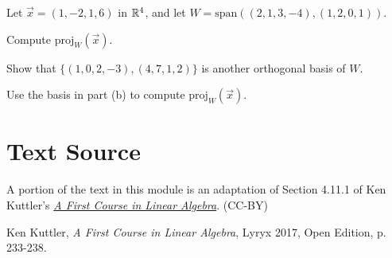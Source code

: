 \documentclass{ximera}
\begin{document}
\begin{problem}
Let $\vec{x} = (1, -2, 1, 6)$ in $\mathbb{R}^4$, and let $W = \mbox{span}\left((2, 1, 3, -4), (1, 2, 0, 1)\right)$.
\begin{problem}\label{OrthoProj1.1}
Compute $\mbox{proj}_W(\vec{x})$.
\end{problem}

\begin{problem}\label{OrthoProj1.2}
Show that $\{(1, 0, 2, -3), (4, 7, 1, 2)\}$ is another orthogonal basis of $W$.
\end{problem}

\begin{problem}\label{OrthoProj1.3}
Use the basis in part (b) to compute $\mbox{proj}_W(\vec{x})$.
\end{problem}

\end{problem}
  
\section*{Text Source}
A portion of the text in this module is an adaptation of Section 4.11.1 of Ken Kuttler's \href{https://open.umn.edu/opentextbooks/textbooks/a-first-course-in-linear-algebra-2017}{\it A First Course in Linear Algebra}. (CC-BY)

Ken Kuttler, {\it  A First Course in Linear Algebra}, Lyryx 2017, Open Edition, p. 233-238.  
\end{document}
